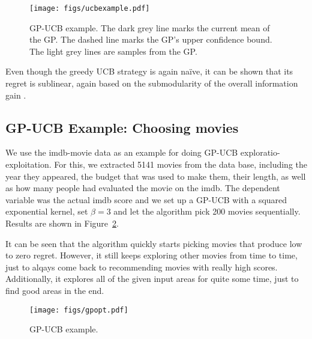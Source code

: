 \documentclass[authoryear,11pt,review]{elsarticle}
\begin{document}
\begin{figure}[ht]
\caption{GP-UCB example. The dark grey line marks the current mean of the GP. The dashed line marks the GP's upper confidence bound. The light grey lines are samples from the GP.}
\label{gpucb}
 \centering
  \texttt{[image: figs/ucbexample.pdf]}
\end{figure}

Even though the greedy UCB strategy is again na\"{i}ve, it can be shown that its regret is sublinear, again based on the submodularity of the overall information gain \citep{srinivas2009gaussian}. 

\subsection{GP-UCB Example: Choosing movies}
We use the imdb-movie data as an example for doing GP-UCB exploratio-exploitation. For this, we extracted 5141 movies from the data base, including the year they appeared, the budget that was used to make them, their length, as well as how many people had evaluated the movie on the imdb. The dependent variable was the actual imdb score and we set up a GP-UCB with a squared exponential kernel, set $\beta=3$ and let the algorithm pick 200 movies sequentially. Results are shown in Figure~\ref{gpucbmovies}.

It can be seen that the algorithm quickly starts picking movies that produce low to zero regret. However, it still keeps exploring other movies from time to time, just to alqays come back to recommending movies with really high scores. Additionally, it explores all of the given input areas for quite some time, just to find good areas in the end.
\begin{figure}[ht]
\caption{GP-UCB example.}
\label{gpucbmovies}
   \texttt{[image: figs/gpopt.pdf]}
\end{figure}
\FloatBarrier

\end{document}
